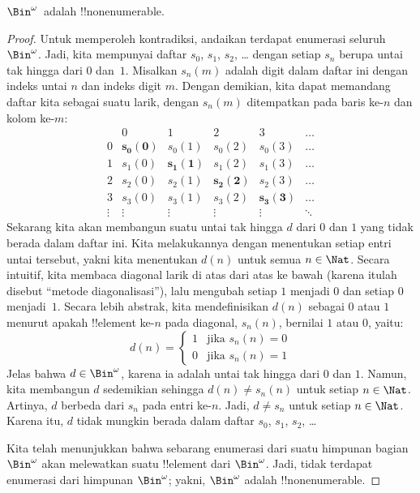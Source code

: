\documentclass[../../../include/open-logic-section]{subfiles}
\begin{document}
\begin{thm}
$\Bin^\omega$~adalah !!{nonenumerable}.
\end{thm}

\begin{proof}
Untuk memperoleh kontradiksi, andaikan terdapat enumerasi seluruh
$\Bin^\omega$. Jadi, kita mempunyai daftar $s_{0}$, $s_{1}$, $s_{2}$,
\dots{} dengan setiap $s_n$
berupa untai tak hingga dari $0$ dan~$1$. Misalkan $s_n(m)$ adalah digit dalam
daftar ini dengan indeks untai $n$ dan indeks digit $m$. Dengan demikian, kita dapat memandang
daftar kita sebagai suatu larik, dengan $s_n(m)$ ditempatkan pada baris ke-$n$
dan kolom ke-$m$:
\[
\begin{array}{c|c|c|c|c|c}
& 0 & 1 & 2 & 3 & \dots \\\hline
0 & \mathbf{s_{0}(0)} & s_{0}(1) & s_{0}(2) & s_0(3) & \dots \\\hline
1 & s_{1}(0)& \mathbf{s_{1}(1)} & s_1(2) & s_1(3) & \dots \\\hline
2 & s_{2}(0)& s_{2}(1) & \mathbf{s_2(2)} & s_2(3) & \dots \\\hline
3 & s_{3}(0)& s_{3}(1) & s_3(2) & \mathbf{s_3(3)} & \dots \\\hline
\vdots & \vdots & \vdots & \vdots & \vdots & \mathbf{\ddots}
\end{array}
\]
Sekarang kita akan membangun suatu untai tak hingga $d$ dari $0$ dan $1$ yang
tidak berada dalam daftar ini. Kita melakukannya dengan menentukan setiap
entri untai tersebut, yakni kita menentukan $d(n)$ untuk semua $n \in \Nat$.
Secara intuitif, kita membaca diagonal larik di atas dari atas ke bawah
(karena itulah disebut ``metode diagonalisasi''), lalu mengubah setiap $1$ menjadi
$0$ dan setiap $0$ menjadi~$1$. Secara lebih abstrak, kita mendefinisikan
$d(n)$ sebagai $0$ atau $1$ menurut apakah !!{element} ke-$n$ pada diagonal,
$s_n(n)$, bernilai $1$ atau $0$, yaitu:
\[
d(n) =
\begin{cases}
1 & \text{jika $s_{n}(n) = 0$}\\
0 & \text{jika $s_{n}(n) = 1$}
\end{cases}
\]
Jelas bahwa $d \in \Bin^\omega$, karena ia adalah untai tak hingga dari $0$
dan $1$. Namun, kita membangun $d$ sedemikian sehingga $d(n) \neq s_n(n)$
untuk setiap $n \in \Nat$. Artinya, $d$ berbeda dari $s_n$ pada entri ke-$n$.
Jadi, $d \neq s_n$ untuk setiap $n\in \Nat$. Karena itu, $d$ tidak mungkin
berada dalam daftar $s_0$, $s_1$, $s_2$, \dots

Kita telah menunjukkan bahwa sebarang enumerasi dari suatu himpunan bagian
$\Bin^\omega$ akan melewatkan suatu !!{element} dari $\Bin^\omega$. Jadi,
tidak terdapat enumerasi dari himpunan $\Bin^\omega$; yakni, $\Bin^\omega$
adalah !!{nonenumerable}.
\end{proof}
\end{document}
